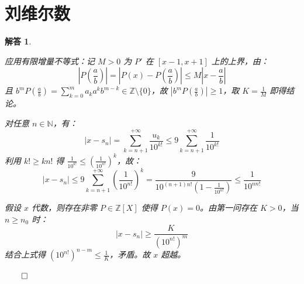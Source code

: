 \documentclass[12pt,UTF8,fontset=none]{ctexbook}
\theoremstyle{exercisestyle}
\theoremstyle{solutionstyle}
\newtheorem*{solution*}{解答}
\newenvironment{solution}
  {\begin{solution*}}
  {\hfill\ensuremath{\qed}\end{solution*}}
\begin{document}
\section{刘维尔数}
\begin{solution}
\begin{subquestions}
\item 应用有限增量不等式：记 $M > 0$ 为 $P'$ 在 $[x-1, x+1]$ 上的上界，由：
$$
\left| P\left(\frac{a}{b}\right) \right| = \left| P(x) - P\left(\frac{a}{b}\right) \right| \leq M \left| x - \frac{a}{b} \right|
$$
且 $b^m P\left(\frac{a}{b}\right) = \sum_{k=0}^m a_k a^k b^{m-k} \in \mathbb{Z} \setminus \{0\}$，故 $\left|b^m P\left(\frac{a}{b}\right)\right| \geq 1$，取 $K = \frac{1}{M}$ 即得结论。

\item 对任意 $n \in \mathbb{N}$，有：
$$
|x - s_n| = \sum_{k=n+1}^{+\infty} \frac{u_k}{10^{k!}} \leq 9 \sum_{k=n+1}^{+\infty} \frac{1}{10^{k!}}
$$
利用 $k! \geq kn!$ 得 $\frac{1}{10^{k!}} \leq \left(\frac{1}{10^{n!}}\right)^k$，故：
$$
|x - s_n| \leq 9 \sum_{k=n+1}^{+\infty} \left(\frac{1}{10^{n!}}\right)^k = \frac{9}{10^{(n+1)n!}(1 - \frac{1}{10^{n!}})} \leq \frac{1}{10^{nn!}}
$$

假设 $x$ 代数，则存在非零 $P \in \mathbb{Z}[X]$ 使得 $P(x)=0$。由第一问存在 $K>0$，当 $n \geq n_0$ 时：
$$
|x - s_n| \geq \frac{K}{(10^{n!})^m}
$$
结合上式得 $(10^{n!})^{n-m} \leq \frac{1}{K}$，矛盾。故 $x$ 超越。

\end{subquestions}
\end{solution}
\end{document}
